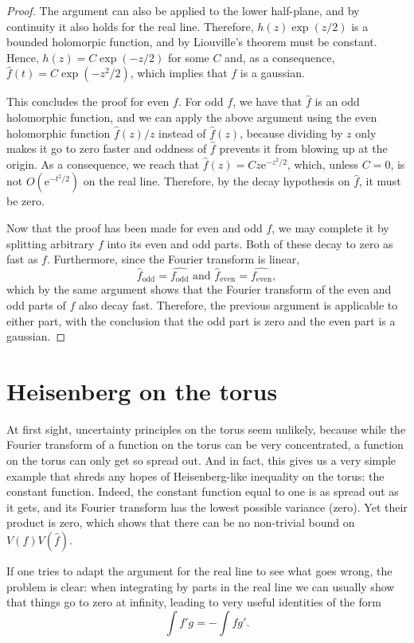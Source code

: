 \documentclass{amsart}
\newcommand{\e}{\mathrm{e}}
\begin{document}
\begin{proof}
The argument can also be applied to the lower half-plane, and by continuity it also holds for the real line. Therefore, $h(z) \exp(z/2)$ is a bounded holomorpic function, and by Liouville's theorem must be constant. Hence, $h(z) = C \exp(-z/2)$ for some $C$ and, as a consequence, $\hat f(t) = C \exp(-z^2/2)$, which implies that $f$ is a gaussian.

This concludes the proof for even $f$. For odd $f$, we have that $\hat f$ is an odd holomorphic function, and we can apply the above argument using the even holomorphic function $\hat f(z)/z$ instead of $\hat f(z)$, because dividing by $z$ only makes it go to zero faster and oddness of $\hat f$ prevents it from blowing up at the origin. As a consequence, we reach that $\hat f(z) = C z \e^{-z^2/2}$, which, unless $C = 0$, is not $O(\e^{-t^2/2})$ on the real line. Therefore, by the decay hypothesis on $\hat f$, it must be zero.

Now that the proof has been made for even and odd $f$, we may complete it by splitting arbitrary $f$ into its even and odd parts. Both of these decay to zero as fast as $f$. Furthermore, since the Fourier transform is linear,
\[\hat f_{\text{odd}} = \widehat{f_{\text{odd}}} \text{ and } \hat f_{\text{even}} = \widehat{f_{\text{even}}},\]
which by the same argument shows that the Fourier transform of the even and odd parts of $f$ also decay fast. Therefore, the previous argument is applicable to either part, with the conclusion that the odd part is zero and the even part is a gaussian.
\end{proof}

\section{Heisenberg on the torus}\label{lastsection}

At first sight, uncertainty principles on the torus seem unlikely, because while the Fourier transform of a function on the torus can be very concentrated, a function on the torus can only get so spread out. And in fact, this gives us a very simple example that shreds any hopes of Heisenberg-like inequality on the torus: the constant function. Indeed, the constant function equal to one is as spread out as it gets, and its Fourier transform has the lowest possible variance (zero). Yet their product is zero, which shows that there can be no non-trivial bound on $V(f) V(\hat f)$.

If one tries to adapt the argument for the real line to see what goes wrong, the problem is clear: when integrating by parts in the real line we can usually show that things go to zero at infinity, leading to very useful identities of the form
\[ \int f' g = - \int f g'.\]
\end{document}
